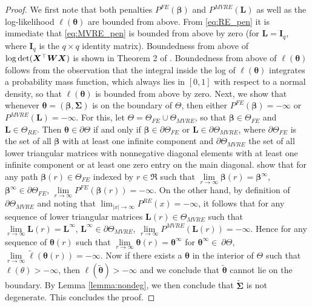 \documentclass[11pt, a4paper]{article}
\newcommand*{\bb}{\boldsymbol}
\theoremstyle{example} \newtheorem{example}{Example}[section]
\theoremstyle{theorem} \newtheorem{theorem}{Theorem}[section]
\theoremstyle{theorem }\newtheorem{proposition}{Proposition}[section]
\theoremstyle{theorem }\newtheorem{corollary}{Corollary}[section]
\def\det{{\mathop{\rm det}}}
\def\btheta{\bb{\theta}}
\def\bSigma{\bb{\Sigma}}
\def\bX{\bb{X}}
\def\bL{\bb{L}}
\def\bttilde{\tilde{\bb{\theta}}}
\def\bW{\bb{W}}
\begin{document}
\begin{proof}
	We first note that both penalties $P^\textit{FE}(\bb \beta)$ and $P^\textit{MVRE}(\bb L)$ as well as the log-likelihood $\ell(\bb \theta)$ are bounded from above. From \eqref{eq:RE_pen} it is immediate that \eqref{eq:MVRE_pen} is bounded from above by zero (for $\bb L= {\bb I}_q$, where ${\bb I}_q$ is the $q\times q$ identity matrix). Boundedness from above of $\log \det(\bX^\top \bW \bX)$ is shown in Theorem 2 of \citet{kosmidis+firth:2020}. Boundedness from above of $\ell(\bb \theta)$ follows from the observation that the integral inside the log of $\ell(\bb \theta)$ integrates a probability mass function, which always lies in $[0,1]$ with respect to a normal density, so that $\ell(\bb \theta)$ is bounded from above by zero. Next, we show that whenever $\btheta =(\bb \beta,\bSigma)$ is on the boundary of $\Theta$, then either $P^\textit{FE}(\bb \beta) = - \infty$ or $P^\textit{MVRE}(\bL) = -\infty$. For this, let $\Theta = \Theta_\textit{FE} \cup \Theta_\textit{MVRE}$, so that $\bb \beta \in \Theta_\textit{FE}$ and $\bL \in \Theta_\textit{RE}$. Then $\btheta \in \partial \Theta$ if and only if $\bb \beta \in \partial \Theta_\textit{FE} $ or $ \bL \in \partial \Theta_\textit{MVRE}$, where $\partial \Theta_\textit{FE}$ is the set of all $\bb \beta$ with at least one infinite component and $\partial \Theta_\textit{MVRE}$ the set of all lower triangular matrices with nonnegative diagonal elements with at least one infinite component or at least one zero entry on the main diagonal. \citet{kosmidis+firth:2020} show that for any path $\bb \beta(r) \in \Theta_{\textit{FE}}$ indexed by $r \in \Re$ such that $\lim\limits_{r \to \infty} \bb \beta(r) = \bb \beta^\infty$, $\bb \beta^\infty \in \partial \Theta_{\textit{FE}}$, $\lim\limits_{r \to \infty} P^{\textit{FE}}(\bb \beta(r)) = -\infty$. On the other hand, by definition of $\partial \Theta_\textit{MVRE}$ and noting that $\lim_{|x| \to \infty} P^\textit{RE}(x) = - \infty $, it follows that for any sequence of lower triangular matrices $\bL(r) \in \Theta_{\textit{MVRE}}$ such that $\lim\limits_{r \to \infty} \bL(r) = \bL^\infty$, $\bL^\infty \in \partial \Theta_{\textit{MVRE} }$, $\lim\limits_{r \to \infty} P^{\textit{MVRE}}(\bL(r)) = -\infty$. Hence for any sequence of $\btheta(r)$ such that $\lim\limits_{r \to \infty} \btheta(r) = \btheta^\infty$ for $\btheta^\infty \in~\partial \Theta$, $\lim\limits_{r \to \infty} \tilde{\ell}(\btheta(r)) = -\infty$. Now if there exists a $\btheta$ in the interior of $\Theta$ such that $\ell(\theta)>-\infty$, then $\ell(\bttilde) >-\infty$ and we conclude that $\bttilde$ cannot lie on the boundary. By Lemma \ref{lemma:nondeg}, we then conclude that $\tilde{\bSigma}$ is not degenerate. This concludes the proof.
\end{proof} 
\end{document}
